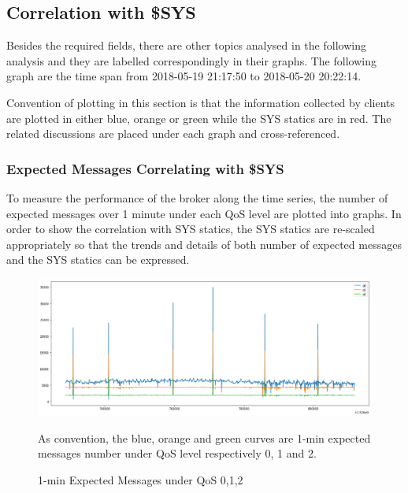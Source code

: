 \documentclass[12pt, letterpaper]{article}
\begin{document}
\subsection{Correlation with \$SYS}

Besides the required fields, there are other topics analysed in the following analysis and they are labelled correspondingly in their graphs. The following graph are the time span from 2018-05-19 21:17:50 to 2018-05-20 20:22:14.

Convention of plotting in this section is that the information collected by clients are plotted in either blue, orange or green while the SYS statics are in red. The related discussions are placed under each graph and cross-referenced.

\subsubsection{Expected Messages Correlating with \$SYS}
To measure the performance of the broker along the time series, the number of expected messages over 1 minute under each QoS level are plotted into graphs. In order to show the correlation with SYS statics, the SYS statics are re-scaled appropriately so that the trends and details of both number of expected messages and the SYS statics can be expressed. 

\FloatBarrier
\begin{figure}
	\setlength{\tabcolsep}{0pt}
	\caption{1-min Expected Messages under QoS 0,1,2}
	\label{f:valid_cnt}
	\begin{center}
	
		\includegraphics[width=\textwidth]{valid_cnt/valid_cnt}	
	
	\end{center}
	As convention, the blue, orange and green curves are 1-min expected messages number under QoS level respectively 0, 1 and 2.
\end{figure}
\end{document}
